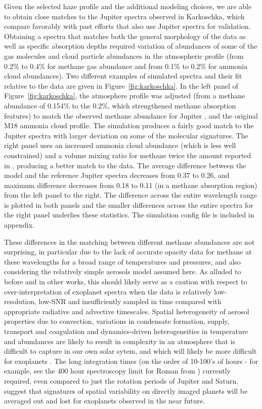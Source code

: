 \documentclass[12pt, letterpaper]{aastex631}
\begin{document}
Given the selected haze profile and the additional modeling choices, we are able to obtain close matches to the Jupiter spectra observed in Karkoschka, which compare favorably with past efforts that also use Jupiter spectra for validation.  Obtaining a spectra that matches both the general morphology of the data as well as specific absorption depths required variation of abundances of some of the gas molecules and cloud particle abundances in the atmospheric profile (from 0.2\% to 0.4\% for methane gas abundance and from 0.1\% to 0.2\% for ammonia cloud abundances). Two different examples of simulated spectra and their fit relative to the data are given in Figure~\ref{fig:karkoschka}. In the left panel of Figure~\ref{fig:karkoschka}, the atmosphere profile was adjusted (from a methane abundance of 0.154\% to the 0.2\%, which strengthened methane absorption features) to match the observed methane abundance for Jupiter \citep{2004jpsm.book...59T}, and the original M18 ammonia cloud profile. The simulation produces a fairly good match to the Jupiter spectra with larger deviation on some of the molecular signatures. The right panel uses an increased ammonia cloud abundance (which is less well constrained) and a volume mixing ratio for methane twice the amount reported in \citep{2004jpsm.book...59T}, producing a better match to the data.  The average difference between the model and the reference Jupiter spectra decreases from 0.37 to 0.26, and maximum difference decreases from 0.18 to 0.11 (in a methane absorption region) from the left panel to the right. The difference across the entire wavelength range is plotted in both panels and the smaller differences across the entire spectra for the right panel underlies these statistics. The simulation config file is included in appendix. 

These differences in the matching between different methane abundances are not surprising, in particular due to the lack of accurate opacity data for methane at these wavelengths for a broad range of temperatures and pressures, and also considering the relatively simple aerosols model assumed here. As alluded to before and in other works, this should likely serve as a caution with respect to over-interpretation of exoplanet spectra when the data is relatively low-resolution, low-SNR and insufficiently sampled in time compared with appropriate radiative and advective timescales.  Spatial heterogeneity of aerosol properties due to convection, variations in condensate formation, supply, transport and coagulation and dynamics-driven heterogeneities in temperature and abundances are likely to result in complexity in an atmosphere that is difficult to capture in our own solar sytem, and which will likely be more difficult for exoplanets \citep{2014arXiv1403.4436F}.  The long integration times (on the order of 10-100's of hours - for example, see the 400 hour spectroscopy limit for Roman from \citep{2019arXiv190104050B}) currently required, even compared to just the rotation periods of Jupiter and Saturn, suggest that signatures of spatial variability on directly imaged planets will be averaged out and lost for exoplanets observed in the near future.
\end{document}
